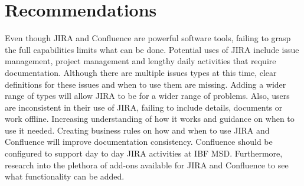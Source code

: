  \section{Recommendations} 
 Even though JIRA and Confluence are powerful software tools, failing to grasp the full capabilities limits what can be done. Potential uses of JIRA include issue management, project management and lengthy daily activities that require documentation. Although there are multiple issues types at this time, clear definitions for these issues and when to use them are missing. Adding a wider range of types will allow JIRA to be for a wider range of problems. Also, users are inconsistent in their use of JIRA, failing to include details, documents or work offline. Increasing understanding of how it works and guidance on when to use it needed. Creating business rules on how and when to use JIRA and Confluence will improve documentation consistency. Confluence should be configured to support day to day JIRA activities at IBF MSD. Furthermore, research into the plethora of add-ons available for JIRA and Confluence to see what functionality can be added. 